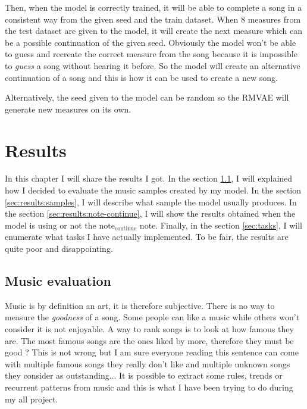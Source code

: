 \documentclass[12pt]{report}
\begin{document}
Then, when the model is correctly trained, it will be able to complete a song in a consistent way from the given seed and the train dataset.
When 8 measures from the test dataset are given to the model, it will create the next measure which can be a possible continuation of the given seed.
Obviously the model won't be able to guess and recreate the correct measure from the song because it is impossible to \textit{guess} a song without hearing it before.
So the model will create an alternative continuation of a song and this is how it can be used to create a new song.

Alternatively, the seed given to the model can be random so the RMVAE will generate new measures on its own. 


\chapter{Results}
\label{chap:results}

In this chapter I will share the results I got.
In the section \ref{sec:results:evaluation}, I will explained how I decided to evaluate the music samples created by my model.
In the section \ref{sec:results:samples}, I will describe what sample the model usually produces.
In the section \ref{sec:results:note-continue}, I will show the results obtained when the model is using or not the $\text{note}_{\text{continue}}$ note.
Finally, in the section \ref{sec:tasks}, I will enumerate what tasks I have actually implemented.
To be fair, the results are quite poor and disappointing.


\section{Music evaluation}
\label{sec:results:evaluation}


Music is by definition an art, it is therefore subjective.
There is no way to measure the \textit{goodness} of a song.
Some people can like a music while others won't consider it is not enjoyable.
A way to rank songs is to look at how famous they are.
The most famous songs are the ones liked by more, therefore they must be good ?
This is not wrong but I am sure everyone reading this sentence can come with multiple famous songs they really don't like and multiple unknown songs they consider as outstanding...
It is possible to extract some rules, trends or recurrent patterns from music and this is what I have been trying to do during my all project.
\end{document}
